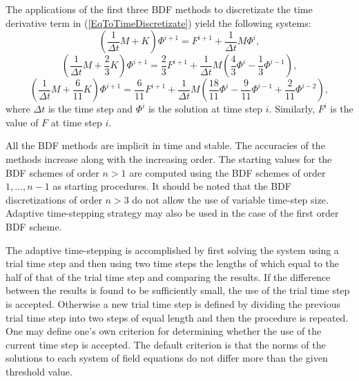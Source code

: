 \begin{versiona}
The applications of the first three BDF methods to discretizate the time derivative term
in (\ref{EqToTimeDiscretizate}) yield the following systems:
\begin{equation}\label{BDF1}
\left (\frac{1}{\Delta t}M+K\right )\Phi^{i+1} = F^{i+1} + \frac{1}{\Delta t}M\Phi^{i},
\end{equation}
\begin{equation}
\left (\frac{1}{\Delta t}M+\frac{2}{3}K\right )\Phi^{i+1} = \frac{2}{3}F^{i+1} + \frac{1}{\Delta t}M
\left( \frac{4}{3}\Phi^{i}-\frac{1}{3}\Phi^{i-1}\right ),
\end{equation}
\begin{equation}
\left (\frac{1}{\Delta t}M+\frac{6}{11}K\right )\Phi^{i+1} = \frac{6}{11}F^{i+1} + \frac{1}{\Delta t}M
\left( \frac{18}{11}\Phi^{i}-\frac{9}{11}\Phi^{i-1}+\frac{2}{11}\Phi^{i-2}\right ),
\end{equation}
where $\Delta t$ is the time step and $\Phi^{i}$ is the solution at time step $i$.
Similarly, $F^{i}$ is the value of $F$ at time step $i$.

All the BDF methods are implicit in time and stable. The accuracies of the
methods increase along with the increasing order. The starting values for the
BDF schemes of order $n>1$ are computed using the BDF schemes of order $1,...,n-1$
as starting procedures. It should be noted that the BDF discretizations of order $n>3$ 
do not allow the use of variable time-step size. 
Adaptive time-stepping strategy may also be used in the case of the first order BDF scheme.

The adaptive time-stepping is accomplished by first solving the system
using a trial time step and then using two time steps the lengths of which equal to the 
half of that of the trial time step and comparing the results. 
If the difference between the results is found to be sufficiently small, the use of
the trial time step is accepted. Otherwise a new trial time step is defined by dividing
the previous trial time step into two steps of equal length and then the procedure 
is repeated. One may define one's own criterion for determining whether the use of 
the current time step is accepted.
The default criterion is that the norms of the solutions to each system of field equations 
do not differ more than the given threshold value.


\end{versiona}
